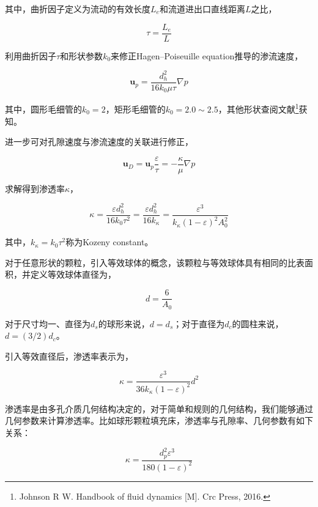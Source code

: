 其中，曲折因子定义为流动的有效长度$ L_e $和流道进出口直线距离$ L $之比，

\[\tau = \frac{L_e}{L}\]

利用曲折因子$ \tau $和形状参数$ k_0 $来修正Hagen–Poiseuille equation推导的渗流速度，

\begin{equation}
\mathbf{u}_p = \frac{d_h^2}{16k_0\mu\tau}\nabla p
\end{equation}

其中，圆形毛细管的$ k_0=2 $，矩形毛细管的$ k_0=2.0\sim2.5 $，其他形状查阅文献\footnote{Johnson R W. Handbook of fluid dynamics [M]. Crc Press, 2016.}获知。

进一步可对孔隙速度与渗流速度的关联进行修正，

\begin{equation}
\mathbf{u}_D = \mathbf{u}_p\frac{\varepsilon}{\tau} = -\frac{\kappa}{\mu}\nabla p
\end{equation}

求解得到渗透率$ \kappa $，

\begin{equation}
\kappa = \frac{\varepsilon d_h^2}{16k_0\tau^2} =
\frac{\varepsilon d_h^2}{16k_\kappa} = 
\frac{\varepsilon^3}{k_\kappa (1-\varepsilon)^2A_0^2}
\end{equation}

其中，$ k_\kappa = k_0\tau^2 $称为Kozeny constant。

对于任意形状的颗粒，引入等效球体的概念，该颗粒与等效球体具有相同的比表面积，并定义等效球体直径为，

\begin{equation}
d = \frac{6}{A_0}
\end{equation}

对于尺寸均一、直径为$ d_s $的球形来说，$ d=d_s $；对于直径为$ d_c $的圆柱来说，$ d=(3/2)d_c $。

引入等效直径后，渗透率表示为，

\begin{equation}
\boxed{\kappa = \frac{\varepsilon^3}{36k_\kappa(1-\varepsilon)^2}d^2}
\end{equation}

渗透率是由多孔介质几何结构决定的，对于简单和规则的几何结构，我们能够通过几何参数来计算渗透率。比如球形颗粒填充床，渗透率与孔隙率、几何参数有如下关系：

\begin{equation}\label{Carman-Kozeny}
\kappa = \frac{d_p^2\varepsilon^3}{180(1-\varepsilon)^2}
\end{equation}


